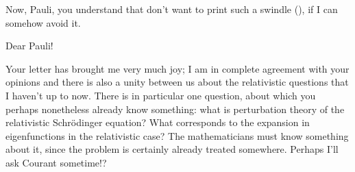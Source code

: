 \documentclass{article}
\begin{document}
{Now, Pauli, you understand that don't want to print such a swindle (), if I can somehow avoid it. 


\date{February 5, 1927}

Dear Pauli!

Your letter has brought me very much joy; I am in complete agreement with your opinions and there is also a unity between us about the relativistic questions that I haven't  up to now. There is in particular one question, about which you perhaps nonetheless already know something: what is perturbation theory of the relativistic Schr\"odinger equation? What corresponds to the expansion in eigenfunctions in the relativistic case? The mathematicians must know something about it, since the problem is certainly already treated somewhere. Perhaps I'll ask Courant sometime!?

}
\end{document}
